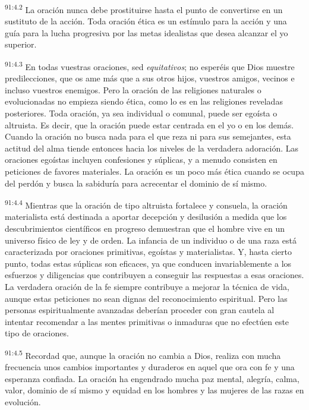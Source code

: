 \par
\textsuperscript{91:4.2} La oración nunca debe prostituirse hasta el punto de convertirse en un sustituto de la acción. Toda oración ética es un estímulo para la acción y una guía para la lucha progresiva por las metas idealistas que desea alcanzar el yo superior.

\par
\textsuperscript{91:4.3} En todas vuestras oraciones, sed \textit{equitativos}; no esperéis que Dios muestre predilecciones, que os ame más que a sus otros hijos, vuestros amigos, vecinos e incluso vuestros enemigos. Pero la oración de las religiones naturales o evolucionadas no empieza siendo ética, como lo es en las religiones reveladas posteriores. Toda oración, ya sea individual o comunal, puede ser egoísta o altruista. Es decir, que la oración puede estar centrada en el yo o en los demás. Cuando la oración no busca nada para el que reza ni para sus semejantes, esta actitud del alma tiende entonces hacia los niveles de la verdadera adoración. Las oraciones egoístas incluyen confesiones y súplicas, y a menudo consisten en peticiones de favores materiales. La oración es un poco más ética cuando se ocupa del perdón y busca la sabiduría para acrecentar el dominio de sí mismo.

\par
\textsuperscript{91:4.4} Mientras que la oración de tipo altruista fortalece y consuela, la oración materialista está destinada a aportar decepción y desilusión a medida que los descubrimientos científicos en progreso demuestran que el hombre vive en un universo físico de ley y de orden. La infancia de un individuo o de una raza está caracterizada por oraciones primitivas, egoístas y materialistas. Y, hasta cierto punto, todas estas súplicas son eficaces, ya que conducen invariablemente a los esfuerzos y diligencias que contribuyen a conseguir las respuestas a esas oraciones. La verdadera oración de la fe siempre contribuye a mejorar la técnica de vida, aunque estas peticiones no sean dignas del reconocimiento espiritual. Pero las personas espiritualmente avanzadas deberían proceder con gran cautela al intentar recomendar a las mentes primitivas o inmaduras que no efectúen este tipo de oraciones.

\par
\textsuperscript{91:4.5} Recordad que, aunque la oración no cambia a Dios, realiza con mucha frecuencia unos cambios importantes y duraderos en aquel que ora con fe y una esperanza confiada. La oración ha engendrado mucha paz mental, alegría, calma, valor, dominio de sí mismo y equidad en los hombres y las mujeres de las razas en evolución.

